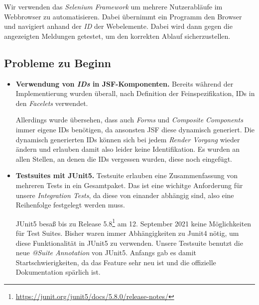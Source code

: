 
Wir verwenden das \emph{Selenium Framework} um mehrere Nutzerabläufe im Webbrowser zu automatisieren.
Dabei übernimmt ein Programm den Browser und navigiert anhand der \emph{ID}
der Webelemente. Dabei wird dann gegen die angezeigten Meldungen getestet, um
den korrekten Ablauf sicherzustellen.

\subsection{Probleme zu Beginn}

\begin{itemize}
	\item \textbf{Verwendung von \emph{IDs} in JSF-Komponenten.} Bereits während der
	Implementierung wurden überall, nach Definition der Feinspezifikation, IDs in den \emph{Facelets} verwendet.

	Allerdings wurde übersehen, dass auch \emph{Forms} und \emph{Composite Components} immer eigene IDs benötigen, da ansonsten JSF diese dynamisch
	generiert. Die dynamisch generierten IDs können sich bei jedem \emph{Render Vorgang} wieder ändern und erlauben damit also leider keine Identifikation.\newline
	Es wurden an allen Stellen, an denen die IDs vergessen wurden, diese noch eingefügt.

	\item \textbf{Testsuites mit JUnit5.} Testsuite erlauben eine Zusammenfassung von mehreren Tests in ein Gesamtpaket. Das ist eine wichitge
	Anforderung für unsere \emph{Integration Tests}, da diese von einander abhängig sind, also eine Reihenfolge festgelegt werden muss.

	JUnit5 besaß bis zu Release 5.8\footnote{\url{https://junit.org/junit5/docs/5.8.0/release-notes/}}
	am 12. September 2021 keine Möglichkeiten für Test Suites. Bisher waren immer Abhängigkeiten zu Junit4 nötig, um diese
	Funktionalität in JUnit5 zu verwenden. Unsere Testsuite benutzt die neue
	\emph{@Suite Annotation} von JUnit5. Anfangs gab es damit Startschwierigkeiten, da das Feature sehr neu ist und die offizielle
	Dokumentation spärlich ist.

\end{itemize}

